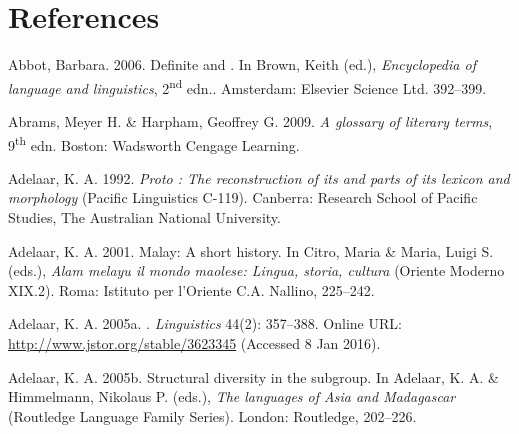 \chapter[References]{References}
\label{Para_R}
\begin{styleCitaviBibliographyEntry}
Abbot, Barbara. 2006. Definite and . In Brown, Keith (ed.), \textit{Encyclopedia of language and linguistics}, 2\textsuperscript{nd} edn.. Amsterdam: Elsevier Science Ltd. 392–399.
\end{styleCitaviBibliographyEntry}

\begin{styleCitaviBibliographyEntry}
Abrams, Meyer H. \& Harpham, Geoffrey G. 2009. \textit{A glossary of literary terms}, 9\textsuperscript{th} edn. Boston: Wadsworth Cengage Learning.
\end{styleCitaviBibliographyEntry}

\begin{styleCitaviBibliographyEntry}
Adelaar, K. A. 1992. \textit{Proto : The reconstruction of its  and parts of its lexicon and morphology} (Pacific Linguistics C-119). Canberra: Research School of Pacific Studies, The Australian National University.
\end{styleCitaviBibliographyEntry}

\begin{styleCitaviBibliographyEntry}
Adelaar, K. A. 2001. Malay: A short history. In Citro, Maria \& Maria, Luigi S. (eds.), \textit{Alam melayu il mondo maolese: Lingua, storia, cultura} (Oriente Moderno XIX.2). Roma: Istituto per l’Oriente C.A. Nallino, 225–242.
\end{styleCitaviBibliographyEntry}

\begin{styleCitaviBibliographyEntry}
Adelaar, K. A. 2005a. . \textit{ Linguistics} 44(2): 357–388. Online URL: \url{http://www.jstor.org/stable/3623345} (Accessed 8 Jan 2016).
\end{styleCitaviBibliographyEntry}

\begin{styleCitaviBibliographyEntry}
Adelaar, K. A. 2005b. Structural diversity in the  subgroup. In Adelaar, K. A. \& Himmelmann, Nikolaus P. (eds.), \textit{The  languages of Asia and Madagascar} (Routledge Language Family Series). London: Routledge, 202–226.
\end{styleCitaviBibliographyEntry}


